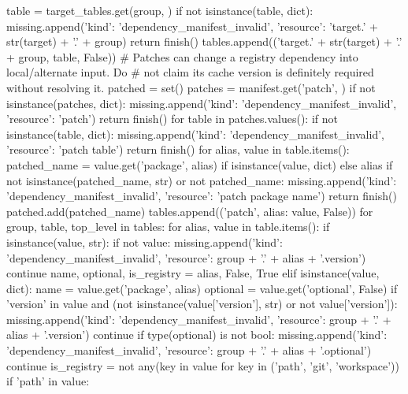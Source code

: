                 table = target_tables.get(group, {})
                if not isinstance(table, dict):
                    missing.append({'kind': 'dependency_manifest_invalid', 'resource': 'target.' + str(target) + '.' + group})
                    return finish()
                tables.append(('target.' + str(target) + '.' + group, table, False))
        # Patches can change a registry dependency into local/alternate input. Do
        # not claim its cache version is definitely required without resolving it.
        patched = set()
        patches = manifest.get('patch', {})
        if not isinstance(patches, dict):
            missing.append({'kind': 'dependency_manifest_invalid', 'resource': 'patch'})
            return finish()
        for table in patches.values():
            if not isinstance(table, dict):
                missing.append({'kind': 'dependency_manifest_invalid', 'resource': 'patch table'})
                return finish()
            for alias, value in table.items():
                patched_name = value.get('package', alias) if isinstance(value, dict) else alias
                if not isinstance(patched_name, str) or not patched_name:
                    missing.append({'kind': 'dependency_manifest_invalid', 'resource': 'patch package name'})
                    return finish()
                patched.add(patched_name)
                tables.append(('patch', {alias: value}, False))
        for group, table, top_level in tables:
            for alias, value in table.items():
                if isinstance(value, str):
                    if not value:
                        missing.append({'kind': 'dependency_manifest_invalid', 'resource': group + '.' + alias + '.version'})
                        continue
                    name, optional, is_registry = alias, False, True
                elif isinstance(value, dict):
                    name = value.get('package', alias)
                    optional = value.get('optional', False)
                    if 'version' in value and (not isinstance(value['version'], str) or not value['version']):
                        missing.append({'kind': 'dependency_manifest_invalid', 'resource': group + '.' + alias + '.version'})
                        continue
                    if type(optional) is not bool:
                        missing.append({'kind': 'dependency_manifest_invalid', 'resource': group + '.' + alias + '.optional'})
                        continue
                    is_registry = not any(key in value for key in ('path', 'git', 'workspace'))
                    if 'path' in value:
